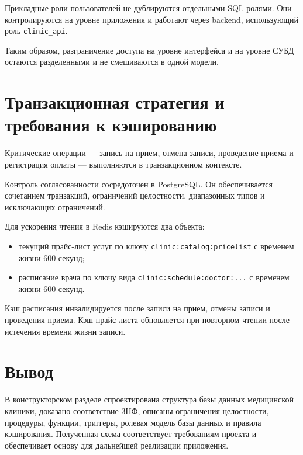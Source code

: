 Прикладные роли пользователей не дублируются отдельными SQL-ролями. Они контролируются на уровне приложения и работают через backend, использующий роль \texttt{clinic\_api}.

Таким образом, разграничение доступа на уровне интерфейса и на уровне СУБД остаются разделенными и не смешиваются в одной модели.

\section{Транзакционная стратегия и требования к кэшированию}

Критические операции --- запись на прием, отмена записи, проведение приема и регистрация оплаты --- выполняются в транзакционном контексте.

Контроль согласованности сосредоточен в PostgreSQL. Он обеспечивается сочетанием транзакций, ограничений целостности, диапазонных типов и исключающих ограничений.

Для ускорения чтения в Redis кэшируются два объекта:
\begin{itemize}
    \item текущий прайс-лист услуг по ключу \texttt{clinic:catalog:pricelist} с временем жизни 600 секунд;
    \item расписание врача по ключу вида \texttt{clinic:schedule:doctor:...} с временем жизни 600 секунд.
\end{itemize}

Кэш расписания инвалидируется после записи на прием, отмены записи и проведения приема. Кэш прайс-листа обновляется при повторном чтении после истечения времени жизни записи.

\section{Вывод}

В конструкторском разделе спроектирована структура базы данных медицинской клиники, доказано соответствие 3НФ, описаны ограничения целостности, процедуры, функции, триггеры, ролевая модель базы данных и правила кэширования. Полученная схема соответствует требованиям проекта и обеспечивает основу для дальнейшей реализации приложения.

\clearpage
